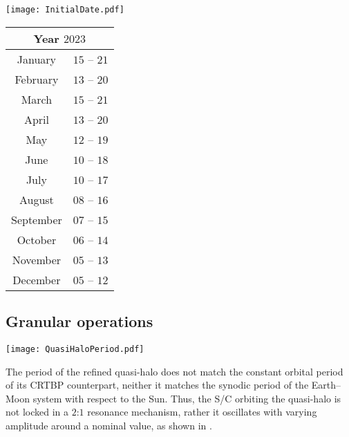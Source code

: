 \begin{figure*}[b!]
%
\begin{minipage}{\textwidth}
	\begin{minipage}[t!]{0.6\textwidth}
		\centering
		\texttt{[image: InitialDate.pdf]}
		\label{fig:InitialDateLUMIO}
	\end{minipage}
	\hfill
	\begin{minipage}[t!]{0.39\textwidth}
		\centering
		\begin{tabular}{cc}
			\toprule
			\multicolumn{2}{c}{Year $2023$} \\
			\midrule
			January & $15$ -- $21$ \\
			February & $13$ -- $20$ \\
			March & $15$ -- $21$ \\
			April & $13$ -- $20$ \\
			May & $12$ -- $19$ \\
			June & $10$ -- $18$ \\
			July & $10$ -- $17$ \\
			August & $08$ -- $16$ \\
			September & $07$ -- $15$ \\
			October & $06$ -- $14$ \\
			November & $05$ -- $13$ \\
			December & $05$ -- $12$ \\
			\bottomrule
		\end{tabular}
		\label{tab:InitialDateLUMIO}
	\end{minipage}
\end{minipage}
%



\subsection{Granular operations}\label{subsec:granularops}
%
\begin{wrapfigure}{}{\wrapTPM}
	\vspace*{-0.3cm}
	\centering
	\texttt{[image: QuasiHaloPeriod.pdf]}
	\caption[Operative quasi-halo period.]{Quasi-halo period. Dashed line is the period of the generating CRTBP halo.}
	\label{fig:QuasiHaloPeriod}
\end{wrapfigure}
%
The period of the refined quasi-halo does not match the constant orbital period of its {CRTBP} counterpart, neither it matches the synodic period of the Earth--Moon system with respect to the Sun. Thus, the S/C orbiting the quasi-halo is not locked in a $2$:$1$ resonance mechanism, rather it oscillates with varying amplitude around a nominal value, as shown in .


\end{figure*}
